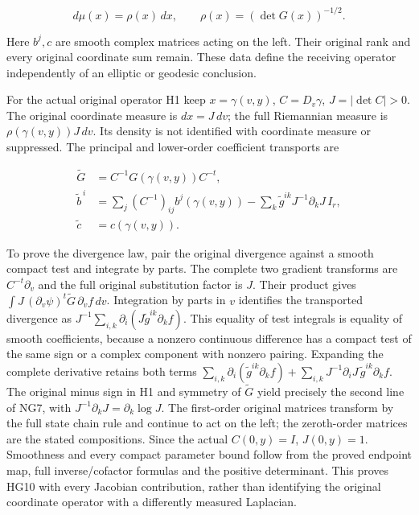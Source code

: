 \documentclass[
  11pt,
]{article}
\begin{document}
\[
                   d\mu(x)=\rho(x)\,dx,
 \qquad \rho(x)=(\det G(x))^{-1/2}.                            \tag{NG7b}
\]

Here \(b^j,c\) are smooth complex matrices acting on the left. Their
original rank and every original coordinate sum remain. These data
define the receiving operator independently of an elliptic or geodesic
conclusion.

For the actual original operator H1 keep \(x=\gamma(v,y)\),
\(C=D_v\gamma\), \(J=|\det C|>0\). The original coordinate measure is
\(dx=J\,dv\); the full Riemannian measure is \(\rho(\gamma(v,y))J\,dv\).
Its density is not identified with coordinate measure or suppressed. The
principal and lower-order coefficient transports are

\[
 \begin{aligned}
 \widetilde G&=C^{-1}G(\gamma(v,y))C^{-t},\\
 \widetilde b^{\,i}
 &=\sum_j(C^{-1})_{ij}b^j(\gamma(v,y))
      -\sum_k\widetilde g^{ik}J^{-1}\partial_kJ\,I_r,\\
 \widetilde c&=c(\gamma(v,y)).
 \end{aligned}
 \tag{NG7}
\]

To prove the divergence law, pair the original divergence against a
smooth compact test and integrate by parts. The complete two gradient
transforms are \(C^{-t}\partial_v\) and the full original substitution
factor is \(J\). Their product gives
\(\int J\,(\partial_v\psi)^t\widetilde G\,\partial_v f\,dv\).
Integration by parts in \(v\) identifies the transported divergence as
\(J^{-1}\sum_{i,k}\partial_i(J\widetilde g^{ik}\partial_k f)\). This
equality of test integrals is equality of smooth coefficients, because a
nonzero continuous difference has a compact test of the same sign or a
complex component with nonzero pairing. Expanding the complete
derivative retains both terms
\(\sum_{i,k}\partial_i(\widetilde g^{ik}\partial_kf)
+\sum_{i,k}J^{-1}\partial_iJ\,\widetilde g^{ik}\partial_kf\). The
original minus sign in H1 and symmetry of \(\widetilde G\) yield
precisely the second line of NG7, with
\(J^{-1}\partial_kJ=\partial_k\log J\). The first-order original
matrices transform by the full state chain rule and continue to act on
the left; the zeroth-order matrices are the stated compositions. Since
the actual \(C(0,y)=I\), \(J(0,y)=1\). Smoothness and every compact
parameter bound follow from the proved endpoint map, full
inverse/cofactor formulas and the positive determinant. This proves HG10
with every Jacobian contribution, rather than identifying the original
coordinate operator with a differently measured Laplacian.
\end{document}
